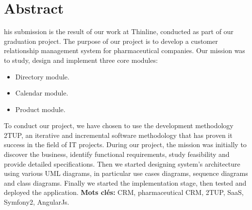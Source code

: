 
\chapter*{Abstract}
\begin{singlespace}
his submission is the result of our work at Thinline, conducted as part of our graduation project. The purpose of our project is to develop a customer relationship management system for pharmaceutical companies. 
\newline
\newline
Our mission was to study, design and implement three core modules:   
    
    \begin{itemize}
        \item Directory module.   
        \item Calendar module.
        \item Product module.
    \end{itemize}

\noindent To conduct our project, we have chosen to use the development methodology 2TUP, an iterative and incremental software methodology that has proven it success in the field of IT projects.
\newline
\newline
During our project, the mission was initially to discover the business, identify functional requirements, study feasibility and provide detailed specifications. Then we started designing system's architecture using various UML diagrams, in particular use cases diagrams, sequence diagrams and class diagrams. Finally we started the implementation stage, then tested and deployed the application.
\vfill{\textbf{Mots clés:} CRM, pharmaceutical CRM, 2TUP, SaaS, Symfony2, AngularJs.}
\end{singlespace}